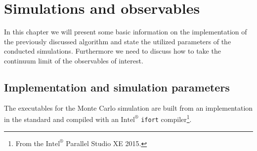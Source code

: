\chapter{Simulations and observables}
In this chapter we will present some basic information on the implementation of the previously discussed algorithm and state the utilized parameters of the conducted simulations. Furthermore we need to discuss how to take the continuum limit of the observables of interest.
%
%
%
%
%
%
\section{Implementation and simulation parameters}
The executables for the Monte Carlo simulation are built from an implementation in the  standard and compiled with an $\text{Intel}^{\circledR}$ \texttt{ifort} compiler\footnote{From the $\text{Intel}^{\circledR}$ Parallel Studio XE 2015.}.